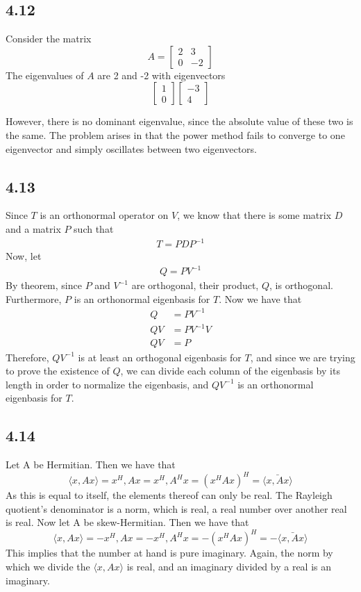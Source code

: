 \documentclass[letterpaper,12pt]{article}
\theoremstyle{definition}
\begin{document}
\subsection*{4.12}
Consider the matrix
\[ A = 
\begin{bmatrix}
    2 & 3 \\
    0 & -2
    
\end{bmatrix}\]
The eigenvalues of $A$ are 2 and -2 with eigenvectors
\[
\begin{bmatrix}
    1 \\
    0
    
\end{bmatrix}
\begin{bmatrix}
    -3 \\ 
    4
    
\end{bmatrix}
\]

However, there is no dominant eigenvalue, since the absolute value of these two is the same. The problem arises in that the power method fails to converge to one eigenvector and simply oscillates between two eigenvectors. 

\subsection*{4.13}

Since $T$ is an orthonormal operator on $V$, we know that there is some matrix $D$ and a matrix $P$ such that 
\begin{align*}
T = PDP^{-1}
\end{align*}
Now, let 
\begin{align*}
Q = PV^{-1}
\end{align*}
By theorem, since $P$ and $V^{-1}$ are orthogonal, their product, $Q$, is orthogonal. Furthermore, $P$ is an orthonormal eigenbasis for $T$. Now we have that
\begin{align*}
Q &= PV^{-1}\\
QV &= PV^{-1}V\\
QV &= P
\end{align*}
Therefore, $QV^{-1}$ is at least an orthogonal eigenbasis for $T$, and since we are trying to prove the existence of $Q$, we can divide each column of the eigenbasis by its length in order to normalize the eigenbasis, and $QV^{-1}$ is an orthonormal eigenbasis for $T$.

\subsection*{4.14}
Let A be Hermitian. Then we have that 
\[\langle x, Ax \rangle =  x^H, Ax = x^H, A^Hx = (x^HAx)^H = \bar{\langle x, Ax \rangle}\] 
As this is equal to itself, the elements thereof can only be real. The Rayleigh quotient's denominator is a norm, which is real, a real number over another real is real. 
Now let A be skew-Hermitian. Then we have that 
\[\langle x, Ax \rangle =  -x^H, Ax = -x^H, A^Hx = -(x^HAx)^H = -\bar{\langle x, Ax \rangle}\] 
This implies that the number at hand is pure imaginary. Again, the norm by which we divide the $\langle x, Ax \rangle$ is real, and an imaginary divided by a real is an imaginary.
\end{document}
